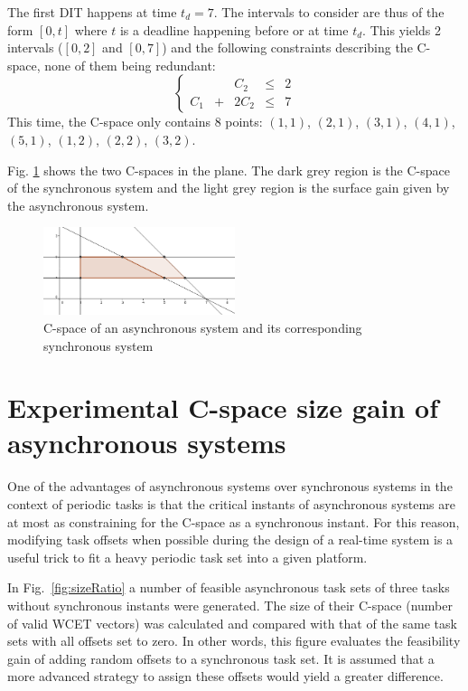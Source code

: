\documentclass[conference]{IEEEtran}
\begin{document}
The first DIT happens at time $t_d = 7$. The intervals to consider are thus of the form $[0, t]$ where $t$ is a deadline happening before or at time $t_d$. This yields 2 intervals ($[0, 2]$ and $[0, 7]$) and the following constraints describing the C-space, none of them being redundant:
$$
\left\{
  \begin{array}{ccccc}
    & & C_2 & \leqslant & 2 \\
    C_1 & + & 2 C_2 & \leqslant & 7
  \end{array}
\right.
$$
This time, the C-space only contains 8 points: $(1, 1)$, $(2, 1)$, $(3, 1)$, $(4, 1)$, $(5, 1)$, $(1, 2)$, $(2, 2)$, $(3, 2)$.

Fig. \ref{fig:cspaceComp} shows the two C-spaces in the plane. The dark grey region is the C-space of the synchronous system and the light grey region is the surface gain given by the asynchronous system.

\begin{figure}[h]
\begin{center}
  \includegraphics[width=0.5\textwidth]{figs/cspace_example.png}
  \caption{C-space of an asynchronous system and its corresponding synchronous system}
  \label{fig:cspaceComp}
\end{center}
\end{figure}


\section{Experimental C-space size gain of asynchronous systems}
\label{sct:expCspaceGain}
	One of the advantages of asynchronous systems over synchronous systems in the
	context of periodic tasks is that the critical instants of asynchronous systems
	are at most as constraining for the C-space as a synchronous instant. For this
	reason, modifying task offsets when possible during
	the design of a real-time system is a useful trick to fit a heavy periodic task set
	into a given platform.

	In Fig.~\ref{fig:sizeRatio} a number of feasible asynchronous task sets of
	three tasks without synchronous instants were generated. The size of their
	C-space (number of valid WCET vectors) was calculated and compared with that of the same
	task sets with all offsets set to zero. In other words, this figure
	evaluates the feasibility gain of adding random offsets to a synchronous task
	set. It is assumed that a more advanced strategy to assign these offsets
	would yield a greater difference.
\end{document}
